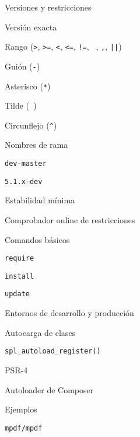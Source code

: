 \begin{longenum}
\begin{longenum}
\begin{longenum}
            \item Versiones y restricciones
            \begin{longenum}
                \item Versión exacta
                \item Rango (\texttt{>}, \texttt{>=}, \texttt{<}, \texttt{<=}, \texttt{!=}, \texttt{ }, \texttt{,}, \texttt{||})
                \item Guión (\texttt{-})
                \item Asterisco (\texttt{*})
                \item Tilde (\texttt{~})
                \item Circunflejo (\texttt{\^})
                \item Nombres de rama
                \begin{longenum}
                    \item \texttt{dev-master}
                    \item \texttt{5.1.x-dev}
                \end{longenum}
                \item Estabilidad mínima
                \item Comprobador online de restricciones
            \end{longenum}
            \item Comandos básicos
            \begin{longenum}
                \item \texttt{require}
                \item \texttt{install}
                \item \texttt{update}
            \end{longenum}
            \item Entornos de desarrollo y producción
        \end{longenum}
        \item Autocarga de clases
        \begin{longenum}
            \item \texttt{spl\_autoload\_register()}
            \item PSR-4
            \item Autoloader de Composer
        \end{longenum}
        \item Ejemplos
        \begin{longenum}
            \item \texttt{mpdf/mpdf}

\end{longenum}
\end{longenum}
\end{longenum}
